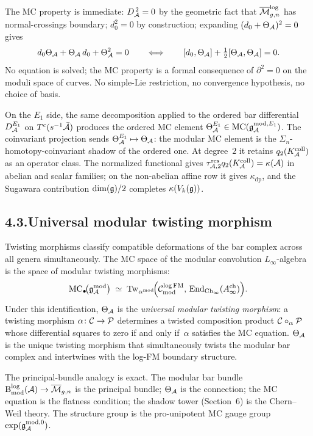 The MC property is immediate: $D_{\mathcal{A}}^{\,2}=0$ by the geometric fact
that $\overline{\mathcal{M}}_{g,n}^{\log}$ has normal-crossings boundary;
$d_0^2=0$ by construction; expanding $(d_0+\Theta_{\mathcal{A}})^2=0$ gives
\[
d_0\Theta_{\mathcal{A}}+\Theta_{\mathcal{A}}\,d_0
+\Theta_{\mathcal{A}}^2=0
\qquad\Longleftrightarrow\qquad
[d_0,\Theta_{\mathcal{A}}]+\tfrac12[\Theta_{\mathcal{A}},\Theta_{\mathcal{A}}]=0.
\]
No equation is solved; the MC property is a formal consequence of
$\partial^2=0$ on the moduli space of curves. No simple-Lie
restriction, no convergence hypothesis, no choice of basis.

On the $E_1$ side, the same decomposition applied to the ordered bar
differential $D^{E_1}_{\mathcal{A}}$ on $T^c(s^{-1}\bar{\mathcal{A}})$ produces the
ordered MC element $\Theta^{E_1}_{\mathcal{A}} \in
\operatorname{MC}(\mathfrak{g}^{\mathrm{mod},E_1}_{\mathcal{A}})$. The
coinvariant projection sends $\Theta^{E_1}_{\mathcal{A}} \mapsto \Theta_{\mathcal{A}}$:
the modular MC element is the $\Sigma_n$-homotopy-coinvariant shadow
of the ordered one. At degree~$2$ it retains
$q_2(K_{\mathcal{A}}^{\mathrm{coll}})$ as an operator class. The normalized
functional gives
$\tau_{\mathcal{A},2}^{\mathrm{res}}q_2(K_{\mathcal{A}}^{\mathrm{coll}})=\kappa(\mathcal{A})$
in abelian and scalar families; on the non-abelian affine row it gives
$\kappa_{\mathrm{dp}}$, and the Sugawara contribution
$\dim(\mathfrak{g})/2$ completes $\kappa(V_k(\mathfrak{g}))$.

\subsection*{4.3.\enspace Universal modular twisting morphism}

Twisting morphisms classify compatible deformations of the
bar complex across all genera simultaneously. The MC space of
the modular convolution $L_\infty$-algebra is the space of
modular twisting morphisms:
\[
\operatorname{MC}_\bullet\!\bigl(\mathfrak{g}_{\mathcal{A}}^{\mathrm{mod}}\bigr)
\;\simeq\;
\operatorname{Tw}_{\alpha^{\mathrm{mod}}}\!\Bigl(
\mathcal{C}^{\log\mathrm{FM}}_{\mathrm{mod}},\,
\operatorname{End}_{\mathrm{Ch}_\infty}(A^{\mathrm{ch}}_\infty)
\Bigr).
\]
Under this identification, $\Theta_{\mathcal{A}}$ is the \emph{universal
modular twisting morphism}: a twisting
morphism $\alpha\colon\mathcal{C}\to\mathcal{P}$ determines a twisted composition
product $\mathcal{C}\circ_\alpha\mathcal{P}$ whose differential squares to zero if
and only if~$\alpha$ satisfies the MC equation. $\Theta_{\mathcal{A}}$ is the
unique twisting morphism that simultaneously twists the modular bar
complex and intertwines with the log-FM boundary structure.

The principal-bundle analogy is exact. The modular bar
bundle $\mathrm{B}^{\log}_{\mathrm{mod}}(\mathcal{A})\to
\overline{\mathcal{M}}_{g,n}$ is the principal bundle; $\Theta_{\mathcal{A}}$ is the
connection; the MC equation is the flatness condition; the shadow
tower (Section~6) is the Chern--Weil theory. The structure group is
the pro-unipotent MC gauge group
$\exp(\mathfrak g^{\mathrm{mod},0}_{\mathcal{A}})$.

